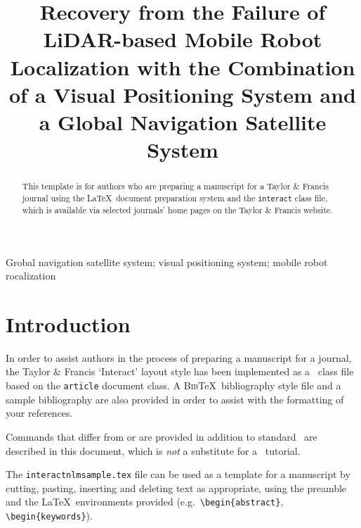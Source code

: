\documentclass[]{interact}
\theoremstyle{plain}%
\theoremstyle{definition}
\theoremstyle{remark}
\begin{document}

\title{Recovery from the Failure of LiDAR-based Mobile Robot Localization with the Combination of a Visual Positioning System and a Global Navigation Satellite System}

\author{
}

\maketitle

\begin{abstract}
This template is for authors who are preparing a manuscript for a Taylor \& Francis journal using the \LaTeX\ document preparation system and the \texttt{interact} class file, which is available via selected journals' home pages on the Taylor \& Francis website.
\end{abstract}

\begin{keywords}
	Grobal navigation satellite system; visual positioning system;  mobile robot rocalization
\end{keywords}


\section{Introduction}

In order to assist authors in the process of preparing a manuscript for a journal, the Taylor \& Francis `\textsf{Interact}' layout style has been implemented as a \LaTeXe\ class file based on the \texttt{article} document class. A \textsc{Bib}\TeX\ bibliography style file and a sample bibliography are also provided in order to assist with the formatting of your references.

Commands that differ from or are provided in addition to standard \LaTeXe\ are described in this document, which is \emph{not} a substitute for a \LaTeXe\ tutorial.

The \texttt{interactnlmsample.tex} file can be used as a template for a manuscript by cutting, pasting, inserting and deleting text as appropriate, using the preamble and the \LaTeX\ environments provided (e.g.\ \verb"\begin{abstract}", \verb"\begin{keywords}").
\end{document}
